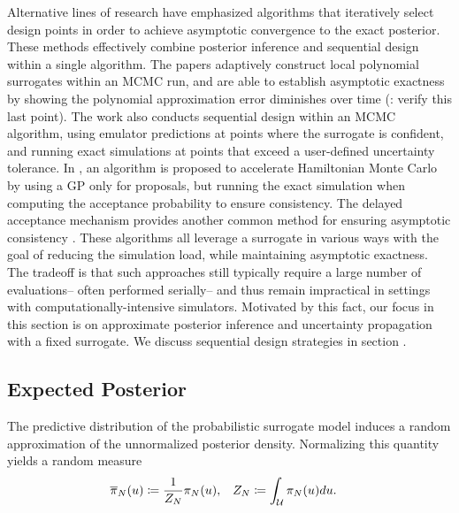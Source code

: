 \documentclass[12pt]{article}
\begin{document}
Alternative lines of research have emphasized algorithms that iteratively select design points in order to 
achieve asymptotic convergence to the exact posterior. These methods effectively combine posterior
inference and sequential design within a single algorithm.
The papers \citet{Li_2014,ConradLocalExactMCMC} 
adaptively construct local polynomial surrogates within an MCMC run, and are able to establish asymptotic 
exactness by showing the polynomial 
approximation error diminishes over time (\todo: verify this last point). The work \citep{ActiveLearningMCMC}
also conducts sequential design within an MCMC algorithm, using emulator predictions at points where the 
surrogate is confident, and running exact simulations at points that exceed a user-defined uncertainty tolerance.
In \citet{MCMC_GP_proposal}, an algorithm is proposed to accelerate Hamiltonian Monte Carlo by using a 
GP only for proposals, but running the exact simulation when computing the acceptance probability to 
ensure consistency. The delayed acceptance mechanism provides another common method for ensuring
asymptotic consistency \citep{DelayedAcceptance}.
These algorithms all leverage a surrogate in various ways with the goal of reducing the simulation load, while
maintaining asymptotic exactness. The tradeoff is that such approaches still typically require a large number of evaluations--
often performed serially-- and thus remain impractical in settings with computationally-intensive simulators.
Motivated by this fact, our focus in this section is on approximate posterior inference and uncertainty propagation
with a fixed surrogate. We discuss sequential design strategies in section \todo. 

\subsection{Expected Posterior}
The predictive distribution of the probabilistic surrogate model induces a random approximation 
of the unnormalized posterior density. Normalizing this quantity yields a random measure
\begin{align}
&\llikEmRdm[\Ndesign]{\postDensNorm}(\Par) 
\Def \frac{1}{\llikEmRdm[\Ndesign]{\normCst}} \llikEmRdmDens[\Ndesign](\Par),
&&\llikEmRdm[\Ndesign]{\normCst} \Def \int_{\parSpace} \llikEmRdmDens[\Ndesign](\Par)d\Par.
\label{post_dens_random_llik}
\end{align}
\end{document}
